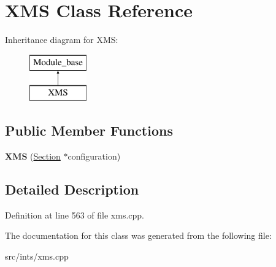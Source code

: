 \hypertarget{classXMS}{\section{X\-M\-S Class Reference}
\label{classXMS}
}
Inheritance diagram for X\-M\-S\-:\begin{figure}[H]
\begin{center}
\leavevmode
\includegraphics[height=2.000000cm]{classXMS}
\end{center}
\end{figure}
\subsection*{Public Member Functions}
\begin{DoxyCompactItemize}
\item 
\hypertarget{classXMS_a09c1f705bac7231151e025c1444f8c2c}{{\bfseries X\-M\-S} (\hyperlink{classSection}{Section} $\ast$configuration)}\label{classXMS_a09c1f705bac7231151e025c1444f8c2c}

\end{DoxyCompactItemize}


\subsection{Detailed Description}


Definition at line 563 of file xms.\-cpp.



The documentation for this class was generated from the following file\-:\begin{DoxyCompactItemize}
\item 
src/ints/xms.\-cpp\end{DoxyCompactItemize}
